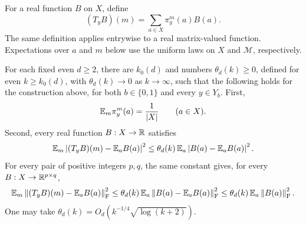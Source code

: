 For a real function $B$ on $X$, define
\[
  (T_yB)(m)=\sum_{a\in X}\pi_y^m(a)B(a).
\]
The same definition applies entrywise to a real matrix-valued function.
Expectations over $a$ and $m$ below use the uniform laws on $X$ and
$\mathcal M$, respectively.

\begin{lemma}
\label{lem:local-averaging}
For each fixed even $d\ge2$, there are $k_0(d)$ and numbers
$\theta_d(k)\ge0$, defined for even $k\ge k_0(d)$, with
$\theta_d(k)\to0$ as $k\to\infty$, such that the following holds for the
construction above, for both $b\in\{0,1\}$ and every $y\in Y_b$.
First,
\begin{equation}
  \mathbb E_m\pi_y^m(a)=\frac1{|X|}\qquad(a\in X).
  \label{local:marginal}
\end{equation}
Second, every real function $B:X\to\mathbb R$ satisfies
\begin{equation}
  \mathbb E_m\left|(T_yB)(m)-\mathbb E_aB(a)\right|^2
  \le\theta_d(k)\,
      \mathbb E_a\left|B(a)-\mathbb E_aB(a)\right|^2.
  \label{local:scalar-variance}
\end{equation}
For every pair of positive integers $p,q$, the same constant gives, for
every $B:X\to\mathbb R^{p\times q}$,
\begin{equation}
  \mathbb E_m\left\lVert(T_yB)(m)-\mathbb E_aB(a)\right\rVert_{\mathrm F}^2
  \le\theta_d(k)\,
      \mathbb E_a\left\lVert B(a)-\mathbb E_aB(a)\right\rVert_{\mathrm F}^2
  \le\theta_d(k)\,\mathbb E_a\left\lVert B(a)\right\rVert_{\mathrm F}^2.
  \label{local:matrix-variance}
\end{equation}
One may take $\theta_d(k)=O_d(k^{-1/4}\sqrt{\log(k+2)})$.
\end{lemma}

